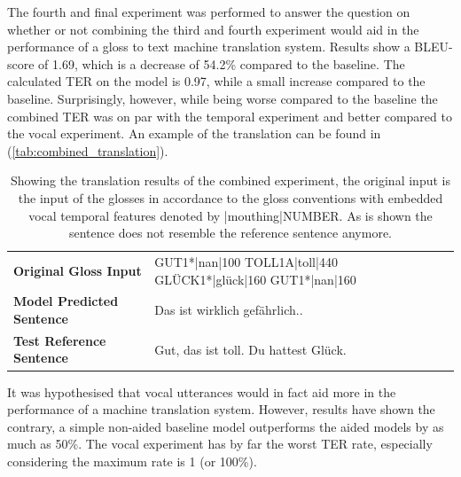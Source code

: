 
The fourth and final experiment was performed to answer the question on whether or not combining the third and fourth experiment would aid in the performance of a gloss to text machine translation system. Results show a BLEU-score of 1.69, which is a decrease of 54.2\% compared to the baseline. The calculated TER on the model is 0.97, while a small increase compared to the baseline. Surprisingly, however, while being worse compared to the baseline the combined TER was on par with the temporal experiment and better compared to the vocal experiment. An example of the translation can be found in (\autoref{tab:combined_translation}).
\begin{table}[h]
\centering
\caption{Showing the translation results of the combined experiment, the original input is the input of the glosses in accordance to the gloss conventions with embedded vocal temporal features denoted by |mouthing|NUMBER. As is shown the sentence does not resemble the reference sentence anymore.}

\begin{tabular}{ll}
\textbf{Original Gloss Input}     & GUT1*|nan|100 TOLL1A|toll|440 GLÜCK1*|glück|160 GUT1*|nan|160 \\
\textbf{Model Predicted Sentence} & Das ist wirklich gefährlich..                                                                                     \\
\textbf{Test Reference Sentence}  & Gut, das ist toll. Du hattest Glück.                                                

\end{tabular}
\bottomrule
\label{tab:combined_translation}
\end{table}

It was hypothesised that vocal utterances would in fact aid more in the performance of a machine translation system. However, results have shown the contrary, a simple non-aided baseline model outperforms the aided models by as much as 50\%. The vocal experiment has by far the worst TER rate, especially considering the maximum rate is 1 (or 100\%).

\mydata

